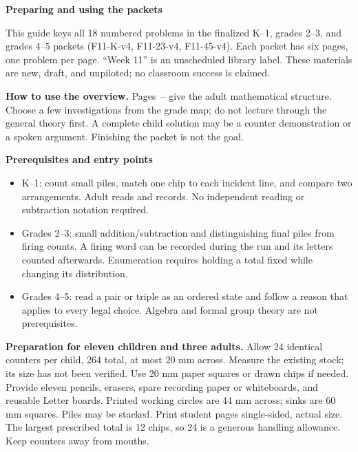 \documentclass[11pt,letterpaper]{article}
\newcommand{\pagehead}[1]{{\Large\bfseries #1}\par\vspace{3pt}}
\begin{document}
\newpage
\pagehead{Preparing and using the packets}\label{preparation}
This guide keys all 18 numbered problems in the finalized K--1, grades 2--3, and grades 4--5 packets (F11-K-v4, F11-23-v4, F11-45-v4). Each packet has six pages, one problem per page. ``Week 11'' is an unscheduled library label. These materials are new, draft, and unpiloted; no classroom success is claimed.

\textbf{How to use the overview.} Pages~\pageref{overview}--\pageref{determination} give the adult mathematical structure. Choose a few investigations from the grade map; do not lecture through the general theory first. A complete child solution may be a counter demonstration or a spoken argument. Finishing the packet is not the goal.

\textbf{Prerequisites and entry points}
\begin{itemize}
\item K--1: count small piles, match one chip to each incident line, and compare two arrangements. Adult reads and records. No independent reading or subtraction notation required.
\item Grades 2--3: small addition/subtraction and distinguishing final piles from firing counts. A firing word can be recorded during the run and its letters counted afterwards. Enumeration requires holding a total fixed while changing its distribution.
\item Grades 4--5: read a pair or triple as an ordered state and follow a reason that applies to every legal choice. Algebra and formal group theory are not prerequisites.
\end{itemize}
\textbf{Preparation for eleven children and three adults.} Allow 24 identical counters per child, 264 total, at most 20 mm across. Measure the existing stock; its size has not been verified. Use 20 mm paper squares or drawn chips if needed. Provide eleven pencils, erasers, spare recording paper or whiteboards, and reusable Letter boards. Printed working circles are 44 mm across; sinks are 60 mm squares. Piles may be stacked. Print student pages single-sided, actual size. The largest prescribed total is 12 chips, so 24 is a generous handling allowance. Keep counters away from mouths.
\end{document}
